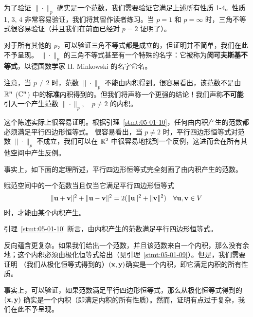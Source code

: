 为了验证 $\| \cdot \|_p$ 确实是一个范数，我们需要验证它满足上述所有性质 1-4。性质 1, 3, 4 非常容易验证，我们将其留作读者练习。当 $p=1$ 和 $p=\infty$ 时，三角不等式很容易验证（并且我们在前面已经对 $p=2$ 证明了）。

对于所有其他的 $p$，可以验证三角不等式都是成立的，但证明并不简单，我们在此不予呈现。
$\| \cdot \|_p$ 的三角不等式甚至有一个特殊的名字：它被称为\textbf{闵可夫斯基不等式}，以德国数学家 H. Minkowski 的名字命名。

注意，当 $p \ne 2$ 时，范数 $\| \cdot \|_p$ 不能由内积得到。很容易看出，该范数不是由 $\mathbb{R}^n$ ($\mathbb{C}^n$) 中的\textbf{标准}内积得到的。但我们将声称一个更强的结论！我们声称\textbf{不可能}引入一个产生范数 $\| \cdot \|_p, \quad p \ne 2$ 的内积。

这个陈述实际上很容易证明。根据引理~\ref{stmt:05-01-10}，任何由内积产生的范数都必须满足平行四边形恒等式。
很容易看出，当 $p \ne 2$ 时，平行四边形恒等式对范数 $\| \cdot \|_p$ 不成立，我们可以在 $\mathbb{R}^2$ 中很容易地找到一个反例，这进而会在所有其他空间中产生反例。

事实上，如下面的定理所述，平行四边形恒等式完全刻画了由内积产生的范数。

\begin{theorem}\label{stmt:05-01-11} 赋范空间中的一个范数当且仅当它满足平行四边形恒等式
$$\|\mathbf{u} + \mathbf{v}\|^2 + \|\mathbf{u} - \mathbf{v}\|^2 = 2(\|\mathbf{u}\|^2 + \|\mathbf{v}\|^2) \quad \forall \mathbf{u}, \mathbf{v} \in V$$
时，才能由某个内积产生。\end{theorem}

引理~\ref{stmt:05-01-10} 断言，由内积产生的范数满足平行四边形恒等式。

反向蕴含更复杂。如果我们给出一个范数，并且该范数来自一个内积，那么没有余地；这个内积必须由极化恒等式给出（见引理~\ref{stmt:05-01-09}）。但是，我们需要证明 （我们从极化恒等式得到的）$(\mathbf{x}, \mathbf{y})$确实是一个内积，即它满足内积的所有性质。

事实上，可以验证，如果范数满足平行四边形恒等式，那么从极化恒等式得到的 $(\mathbf{x}, \mathbf{y})$ 确实是一个内积（即满足内积的所有性质）。然而，证明有点过于复杂，我们在此不予呈现。


